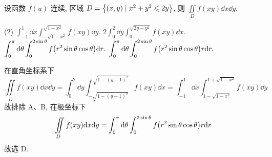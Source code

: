 
\begin{example}
    设函数 $f(u)$ 连续, 区域 $D=\qty{(x,y)\mid x^2+y^2\leqslant 2y}$, 则 $\displaystyle\iint\limits_D f(xy)\dd x\dd y$.
    \begin{tasks}(2)
        \task $\displaystyle \int_{-1}^{1}\dd x\int_{-\sqrt{1-x^2}}^{\sqrt{1-x^2}}f(xy)\dd y.$
        \task $\displaystyle 2\int_{0}^{2}\dd y\int_{0}^{\sqrt{2y-y^2}}f(xy)\dd x.$
        \task $\displaystyle \int_{0}^{\pi}\dd \theta\int_{0}^{2\sin\theta}f\qty(r^2\sin\theta\cos\theta)\dd r.$
        \task $\displaystyle \int_{0}^{\pi}\dd \theta\int_{0}^{2\sin\theta}f\qty(r^2\sin\theta\cos\theta)r\dd r.$
    \end{tasks}
\end{example}
\begin{solution}
    在直角坐标系下
    $$\iint\limits_Df(xy)\dd x\dd y=\int_{0}^{2}\dd y\int_{-\sqrt{1-(y-1)^2}}^{\sqrt{1-(y-1)^2}}f(xy)\dd x=\int_{-1}^{1}\dd x\int_{1-\sqrt{1-x^2}}^{1+\sqrt{1-x^2}}f(xy)\dd y$$
    故排除 A、B, 在极坐标下
    $$\iint\limits_D f(xy)\dd x\dd y=\int_{0}^{\pi}\dd \theta\int_{0}^{2\sin\theta}f\qty(r^2\sin\theta\cos\theta)r\dd r$$
    故选 D.
\end{solution}


